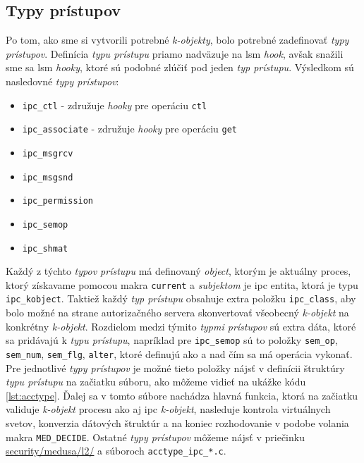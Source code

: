 \subsection{Typy prístupov}
Po tom, ako sme si vytvorili potrebné \textit{k-objekty}, bolo potrebné zadefinovať \textit{typy prístupov}. Definícia \textit{typu prístupu} priamo nadväzuje na \acrshort{lsm} \textit{hook}, avšak snažili sme sa \acrshort{lsm} \textit{hooky}, ktoré sú podobné zlúčiť pod jeden \textit{typ prístupu}. Výsledkom sú nasledovné \textit{typy prístupov}:
\begin{itemize}
\item \texttt{ipc\_ctl} - združuje \textit{hooky} pre operáciu \texttt{ctl}
\item \texttt{ipc\_associate} - združuje \textit{hooky} pre operáciu \texttt{get}
\item \texttt{ipc\_msgrcv}
\item \texttt{ipc\_msgsnd}
\item \texttt{ipc\_permission}
\item \texttt{ipc\_semop}
\item \texttt{ipc\_shmat}
\end{itemize} 
Každý z týchto \textit{typov prístupu} má definovaný \textit{object}, ktorým je aktuálny proces, ktorý získavame pomocou makra \texttt{current} a \textit{subjektom} je \acrshort{ipc} entita, ktorá je typu \texttt{ipc\_kobject}. Taktiež každý \textit{typ prístupu} obsahuje extra položku \texttt{ipc\_class}, aby bolo možné na strane autorizačného servera skonvertovať všeobecný \textit{k-objekt} na konkrétny \textit{k-objekt}. Rozdielom medzi týmito \textit{typmi prístupov} sú extra dáta, ktoré sa pridávajú k \textit{typu prístupu}, napríklad pre \texttt{ipc\_semop} sú to položky \texttt{sem\_op}, \texttt{sem\_num}, \texttt{sem\_flg}, \texttt{alter}, ktoré definujú ako a nad čím sa má operácia vykonať. Pre jednotlivé \textit{typy prístupov} je možné tieto položky nájsť v definícii štruktúry \textit{typu prístupu} na začiatku súboru, ako môžeme vidieť na ukážke kódu \ref{lst:acctype}. Ďalej sa v tomto súbore nachádza hlavná funkcia, ktorá na začiatku validuje \textit{k-objekt} procesu ako aj \acrshort{ipc} \textit{k-objekt}, nasleduje kontrola virtuálnych svetov, konverzia dátových štruktúr a na koniec rozhodovanie v podobe volania makra \texttt{MED\_DECIDE}. Ostatné \textit{typy prístupov} môžeme nájsť v priečinku \url{security/medusa/l2/} a súboroch \texttt{acctype\_ipc\_*.c}. 

